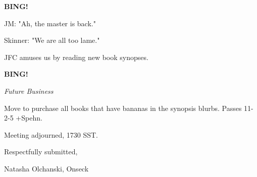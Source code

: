 \documentclass[12pt]{article}
\newcommand{\bing}{{\bf BING!} }
\newcommand{\goto}[1]{\bing \vskip 12pt \centerline{{\em{#1}}}}
\begin{document}
\bing

JM: "Ah, the master is back."

Skinner: "We are all too lame."

JFC amuses us by reading new book synopses.

\goto{Future Business}

Move to purchase all books that have bananas in the synopsis blurbs. Passes 11-2-5 +Spehn.

\vspace{12pt}

\noindent
Meeting adjourned, 1730 SST.

\vspace{18pt}

\centerline{Respectfully submitted,}
\centerline{Natasha Olchanski, Onseck}
\end{document}
